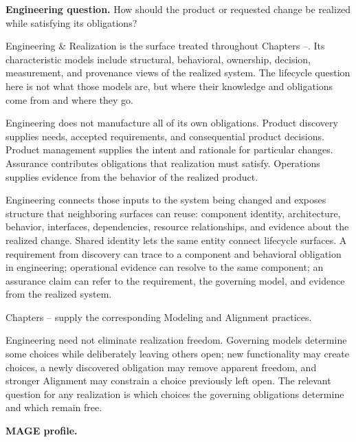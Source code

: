 

\textbf{Engineering question.} How should the product or requested change be realized while satisfying its obligations?

Engineering \& Realization is the surface treated throughout Chapters --. Its characteristic models include structural, behavioral, ownership, decision, measurement, and provenance views of the realized system. The lifecycle question here is not what those models are, but where their knowledge and obligations come from and where they go.

Engineering does not manufacture all of its own obligations. Product discovery supplies needs, accepted requirements, and consequential product decisions. Product management supplies the intent and rationale for particular changes. Assurance contributes obligations that realization must satisfy. Operations supplies evidence from the behavior of the realized product.

Engineering connects those inputs to the system being changed and exposes structure that neighboring surfaces can reuse: component identity, architecture, behavior, interfaces, dependencies, resource relationships, and evidence about the realized change. Shared identity lets the same entity connect lifecycle surfaces. A requirement from discovery can trace to a component and behavioral obligation in engineering; operational evidence can resolve to the same component; an assurance claim can refer to the requirement, the governing model, and evidence from the realized system.

Chapters -- supply the corresponding Modeling and Alignment practices.

Engineering need not eliminate realization freedom. Governing models determine some choices while deliberately leaving others open; new functionality may create choices, a newly discovered obligation may remove apparent freedom, and stronger Alignment may constrain a choice previously left open. The relevant question for any realization is which choices the governing obligations determine and which remain free.

\textbf{MAGE profile.}

